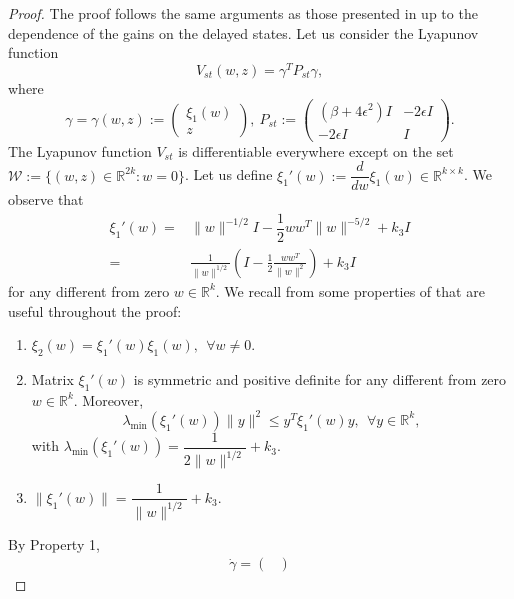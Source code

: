 \documentclass[onecolumn]{IEEEtran}
\newtheorem{proof}{Proof}
\begin{document}
\begin{proof}
	The proof  follows the same arguments as those presented in \cite{Vidaletal2016} up to the dependence of the gains on the delayed states.
	 Let us consider the Lyapunov function
	\begin{equation*}
	V_{st}(w,z)=\gamma^TP_{st}\gamma,
	\end{equation*}
	where
	\begin{equation*}
	\gamma=\gamma(w,z):=\begin{pmatrix}
	\xi_1(w)\\ z
	\end{pmatrix},\:P_{st}:=\begin{pmatrix}
	\left(\beta +4\epsilon^2\right) I & -2\epsilon I \\
	-2\epsilon I & I
	\end{pmatrix}.
	\end{equation*}
	The Lyapunov function $V_{st}$ is differentiable everywhere except on the set $\mathcal{W}:=\{(w,z)\in \mathbb{R}^{2k}: w=0 \}$. Let us  define $\xi_1'(w):=\dfrac{d}{dw}\xi_1(w)\in \mathbb{R}^{k\times k}$. We observe that
	\begin{equation*}
	\begin{split}
	\xi_1'(w)=&\|w\|^{-1/2}I-\dfrac{1}{2}ww^T\|w\|^{-5/2}+k_3I\\
	=&\frac{1}{\|w\|^{1/2}}\left(I-\frac{1}{2}\frac{ww^T}{\|w\|^2}\right)+k_3I
	\end{split}
	\end{equation*}
	for any  different from zero $w\in \mathbb{R}^k$.  We recall from \cite{Vidaletal2016}  some properties of that are useful throughout the proof:
	\begin{enumerate}
		\item $\xi_2(w)=\xi_1'(w)\xi_1(w),\:\:\forall w\neq 0$.
		\item Matrix $\xi_1'(w)$ is symmetric and positive definite for any different from zero $w\in \mathbb{R}^k$. Moreover,
		\begin{equation*}		
		\lambda_{\min}(\xi_1'(w))\|y\|^2\leq y^T\xi_1'(w)y,\:\:\forall y\in \mathbb{R}^k,
		\end{equation*}
		with $\lambda_{\min}(\xi_1'(w))=\dfrac{1}{2\|w\|^{1/2}}+k_3$.
		\item $\|\xi_1'(w)\|=\dfrac{1}{\|w\|^{1/2}}+k_3.$ 
	\end{enumerate}
	By Property 1, 
	\begin{equation*}
	\begin{split}
	\dot \gamma =\begin{pmatrix}

\end{pmatrix}
\end{split}
\end{equation*}
\end{proof}
\end{document}
